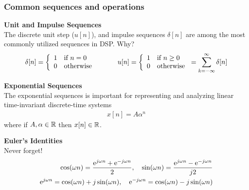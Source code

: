 \documentclass[mathserif,9pt,handout]{beamer}
\begin{document}
\begin{frame}\frametitle{Common sequences and operations}\small
  {\bf\color{blue!50!black}Unit and Impulse Sequences} \\
  The discrete unit step ($u[n]$), and impulse sequences $\delta[n]$ are among the most commonly utilized sequences in DSP. Why? 
  \begin{align}
     \delta[n] = \left\{ 
         \begin{array}{l l}
           1 & \textrm{if } n=0 \\
           0 & \textrm{otherwise}
         \end{array}
       \right.
     \hspace{3em}
     u[n] = \left\{ 
         \begin{array}{l l}
           1 & \textrm{if } n \geq 0 \\
           0 & \textrm{otherwise}
         \end{array}
       \right. = \sum_{k=-\infty}^{\infty} \delta[n]
     \nonumber
  \end{align}
  
  {\bf\color{blue!50!black}Exponential Sequences} \\
  The exponential sequences is important for representing and analyzing linear time-invariant discrete-time systems
  \begin{align}
    x[n] = A \alpha^n \nonumber
  \end{align}
  where if $A,\alpha \in {\mathbb R}$ then $x[n] \in {\mathbb R}$.\\
  \vspace{1em} 
  
  {\bf\color{blue!50!black}Euler's Identities} \\
  Never forget!
  \begin{align}
    \cos(\omega n) = \frac{{\textrm{e}}^{j\omega n} + {\textrm{e}}^{-j\omega n}}{2}, \hspace{1em}
    \sin(\omega n) = \frac{{\textrm{e}}^{j\omega n} - {\textrm{e}}^{-j\omega n}}{j2} \nonumber \\
    {\textrm{e}}^{j\omega n} = \cos(\omega n) + j \sin(\omega n), \hspace{1em}
    {\textrm{e}}^{-j\omega n} = \cos(\omega n) - j \sin(\omega n)
    \nonumber
  \end{align}
\end{frame}
\end{document}
